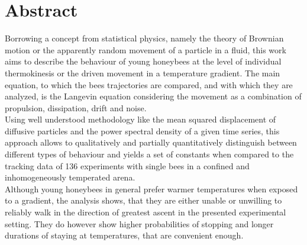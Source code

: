 

\chapter*{Abstract}
\label{cha:abstract}

Borrowing a concept from statistical physics, namely the theory of Brownian motion or the apparently random movement of a particle in a fluid, this work aims to describe the behaviour of young honeybees at the level of individual thermokinesis or the driven movement in a temperature gradient.
The main equation, to which the bees trajectories are compared, and with which they are analyzed, is the Langevin equation considering the movement as a combination of propulsion, dissipation, drift and noise. \\
Using well understood methodology like the mean squared displacement of diffusive particles and the power spectral density of a given time series, this approach allows to qualitatively and partially quantitatively distinguish between different types of behaviour and yields a set of constants when compared to the tracking data of 136 experiments with single bees in a confined and inhomogeneously temperated arena. \\
Although young honeybees in general prefer warmer temperatures when exposed to a gradient, the analysis shows, that they are either unable or unwilling to reliably walk in the direction of greatest ascent in the presented experimental setting. They do however show higher probabilities of stopping and longer durations of staying at temperatures, that are convenient enough. \\





